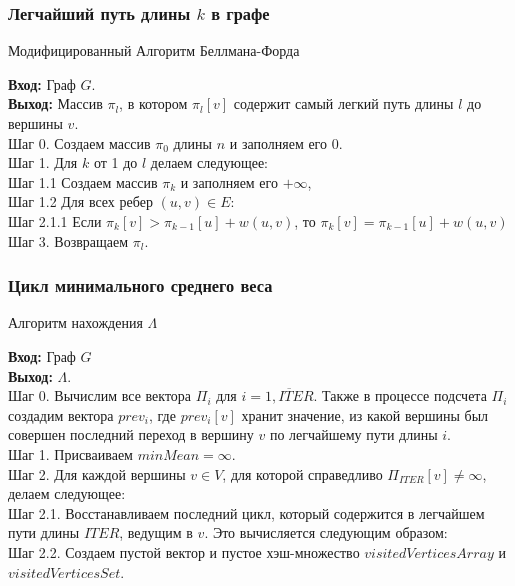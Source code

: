 \documentclass{beamer}
\begin{document}
\begin{frame}
    \frametitle{Легчайший путь длины $k$ в графе}
\begin{algorithm}[H]
\caption{Модифицированный Алгоритм Беллмана-Форда}
\label{diff_graph_construct}
\textbf{Вход:} Граф $G$.\\
\textbf{Выход:} Массив $\pi_l$, в котором $\pi_l[v]$ содержит самый легкий путь длины $l$ до вершины $v$.\\
Шаг 0. Создаем массив $\pi_0$ длины $n$ и заполняем его $0$. \\
Шаг 1. Для $k$ от 1 до $l$ делаем следующее:\\
Шаг 1.1 Создаем массив $\pi_k$ и заполняем его $+\infty$,\\
Шаг 1.2 Для всех ребер $(u, v) \in E:$\\
Шаг 2.1.1 Если $\pi_k[v] > \pi_{k-1}[u] + w(u,v)$, то $\pi_k[v] = \pi_{k-1}[u] + w(u,v)$\\
Шаг 3. Возвращаем $\pi_l$.\\
\end{algorithm}
  \end{frame}
\begin{frame}
    \frametitle{Цикл минимального среднего веса}
\begin{algorithm}[H]
\caption{Алгоритм нахождения $\Lambda$}
\label{diff_graph_construct}
\textbf{Вход:} Граф $G$\\
\textbf{Выход:} $\Lambda$.\\
Шаг 0. Вычислим все вектора $\Pi_i$ для $i = \overline{1, ITER}$. Также в процессе подсчета $\Pi_i$ создадим вектора $prev_i$, где $prev_i[v]$ хранит значение, из какой вершины был совершен последний переход в вершину $v$ по легчайшему пути длины $i$.\\
Шаг 1. Присваиваем $minMean = \infty$.\\
Шаг 2. Для каждой вершины $v \in V$, для которой справедливо $\Pi_{ITER}[v] \ne \infty$, делаем следующее:\\
Шаг 2.1. Восстанавливаем последний цикл, который содержится в легчайшем пути длины $ITER$, ведущим в $v$. Это вычисляется следующим образом:\\
Шаг 2.2. Создаем пустой вектор и пустое хэш-множество $visitedVerticesArray$ и $visitedVerticesSet$.\\
\end{algorithm}
  \end{frame}
\end{document}
